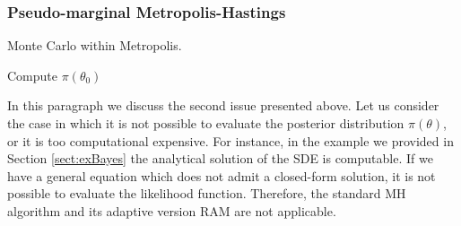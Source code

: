 \subsubsection{Pseudo-marginal Metropolis-Hastings} \label{sec:MCWM}
\begin{algorithm}[t]
	\caption{Monte Carlo within Metropolis.}
	\label{alg:MCWM}
	Compute $\pi(\theta_0)$ \;
\end{algorithm}
In this paragraph we discuss the second issue presented above. Let us consider the case in which it is not possible to evaluate the posterior distribution $\pi(\theta)$, or it is too computational expensive. For instance, in the example we provided in Section \ref{sect:exBayes} the analytical solution of the SDE is computable. If we have a general equation which does not admit a closed-form solution, it is not possible to evaluate the likelihood function. Therefore, the standard MH algorithm and its adaptive version RAM are not applicable.

